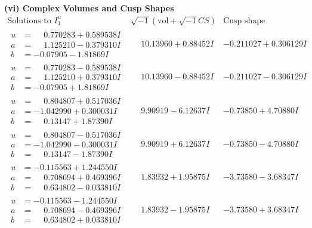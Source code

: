 \documentclass[1p]{elsarticle_modified}
\theoremstyle{definition}
\newcommand{\I}{\sqrt{-1}}
\begin{document}
\newpage\flushleft \textbf{(vi) Complex Volumes and Cusp Shapes}
$$\begin{array}{c|c|c}  
\text{Solutions to }I^u_{1}& \I (\text{vol} + \sqrt{-1}CS) & \text{Cusp shape}\\
 \hline 
\begin{aligned}
u &= \phantom{-}0.770283 + 0.589538 I \\
a &= \phantom{-}1.125210 - 0.379310 I \\
b &= -0.07905 - 1.81869 I\end{aligned}
 & \phantom{-}10.13960 + 0.88452 I & -0.211027 + 0.306129 I \\ \hline\begin{aligned}
u &= \phantom{-}0.770283 - 0.589538 I \\
a &= \phantom{-}1.125210 + 0.379310 I \\
b &= -0.07905 + 1.81869 I\end{aligned}
 & \phantom{-}10.13960 - 0.88452 I & -0.211027 - 0.306129 I \\ \hline\begin{aligned}
u &= \phantom{-}0.804807 + 0.517036 I \\
a &= -1.042990 + 0.300031 I \\
b &= \phantom{-}0.13147 + 1.87390 I\end{aligned}
 & \phantom{-}9.90919 - 6.12637 I & -0.73850 + 4.70880 I \\ \hline\begin{aligned}
u &= \phantom{-}0.804807 - 0.517036 I \\
a &= -1.042990 - 0.300031 I \\
b &= \phantom{-}0.13147 - 1.87390 I\end{aligned}
 & \phantom{-}9.90919 + 6.12637 I & -0.73850 - 4.70880 I \\ \hline\begin{aligned}
u &= -0.115563 + 1.244550 I \\
a &= \phantom{-}0.708694 + 0.469396 I \\
b &= \phantom{-}0.634802 - 0.033810 I\end{aligned}
 & \phantom{-}1.83932 + 1.95875 I & -3.73580 - 3.68347 I \\ \hline\begin{aligned}
u &= -0.115563 - 1.244550 I \\
a &= \phantom{-}0.708694 - 0.469396 I \\
b &= \phantom{-}0.634802 + 0.033810 I\end{aligned}
 & \phantom{-}1.83932 - 1.95875 I & -3.73580 + 3.68347 I \\ \hline\begin{aligned}

\end{aligned}
\end{array}$$
\end{document}
